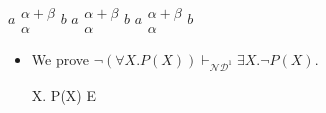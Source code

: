 \documentclass{article}
\begin{document}

\iffalse
$ a \begin{array}{l} \alpha+\beta \\ \alpha \end{array} b $
$ a \begin{array}{c} \alpha+\beta \\ \alpha \end{array} b $
$ a \begin{array}{r} \alpha+\beta \\ \alpha \end{array} b $

\begin{itemize}
  \item We prove $\neg(\forall X.P(X))\vdash_{\mathcal{ND}^1}\exists X.\neg P(X)$.
  \begin{displaynd}
           {\exists X. \neg P(X)}
           {\neg E}
  \end{displaynd}
\end{itemize}
\end{document}
